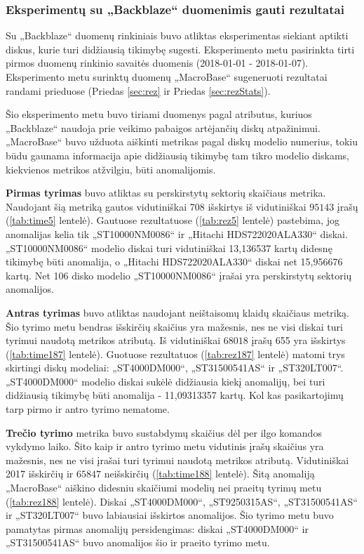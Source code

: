 \documentclass{VUMIFPSkursinis}
\begin{document}
\subsubsection{Eksperimentų su „Backblaze“ duomenimis gauti rezultatai} \label{subsubsec:backblazeExp}
Su „Backblaze“ duomenų rinkiniais buvo atliktas eksperimentas siekiant aptikti diskus, kurie turi didžiausią tikimybę sugesti. Eksperimento metu pasirinkta tirti pirmos duomenų rinkinio savaitės duomenis (2018-01-01 - 2018-01-07). Eksperimento metu surinktų duomenų „MacroBase“ sugeneruoti rezultatai randami prieduose (Priedas \ref{sec:rez} ir Priedas \ref{sec:rezStats}).\par
Šio eksperimento metu buvo tiriami duomenys pagal atributus, kuriuos „Backblaze“ naudoja prie veikimo pabaigos artėjančių diskų atpažinimui. „MacroBase“ buvo užduota aiškinti metrikas pagal diskų modelio numerius, tokiu būdu gaunama informacija apie didžiausią tikimybę tam tikro modelio diskams, kiekvienos metrikos atžvilgiu, būti anomalijomis.\par

\textbf{Pirmas tyrimas} buvo atliktas su perskirstytų sektorių skaičiaus metrika. Naudojant šią metriką gautos vidutiniškai 708 išskirtys iš vidutiniškai $95 143$ įrašų (\ref{tab:time5} lentelė). Gautuose rezultatuose (\ref{tab:rez5} lentelė) pastebima, jog anomalijas kelia tik „ST10000NM0086“ ir „Hitachi HDS722020ALA330“ diskai. „ST10000NM0086“ modelio diskai turi vidutiniškai 13,136537 kartų didesnę tikimybę būti anomalija, o „Hitachi HDS722020ALA330“ diskai net 15,956676 kartų. Net 106 disko modelio „ST10000NM0086“ įrašai yra perskirstytų sektorių anomalijos.\par

\textbf{Antras tyrimas} buvo atliktas naudojant neištaisomų klaidų skaičiaus metriką. Šio tyrimo metu bendras išskirčių skaičius yra mažesnis, nes ne visi diskai turi tyrimui naudotą metrikos atributą. Iš vidutiniškai $68 018$ įrašų 655 yra išskirtys (\ref{tab:time187} lentelė). Guotuose rezultatuos (\ref{tab:rez187} lentelė) matomi trys skirtingi diskų modeliai: „ST4000DM000“, „ST31500541AS“ ir „ST320LT007“. „ST4000DM000“ modelio diskai sukėlė didžiausia kiekį anomalijų, bei turi didžiausią tikimybę būti anomalija - 11,09313357 kartų. Kol kas pasikartojimų tarp pirmo ir antro tyrimo nematome.\par

\textbf{Trečio tyrimo} metrika buvo sustabdymų skaičius dėl per ilgo komandos vykdymo laiko. Šito kaip ir antro tyrimo metu vidutinis įrašų skaičius yra mažesnis, nes ne visi įrašai turi tyrimui naudotą metrikos atributą. Vidutiniškai 2017 išskirčių ir $65 847$ neišskirčių (\ref{tab:time188} lentelė). Šitą anomaliją „MacroBase“ aiškino didesniu skaičiumi modelių nei praeitų tyrimų metu (\ref{tab:rez188} lentelė). Diskai „ST4000DM000“, „ST9250315AS“, „ST31500541AS“ ir „ST320LT007“ buvo labiausiai išskirtos anomalijos. Šio tyrimo metu buvo pamatytas pirmas anomalijų persidengimas: diskai „ST4000DM000“ ir „ST31500541AS“ buvo anomalijos šio ir praeito tyrimo metu.\par
\end{document}
